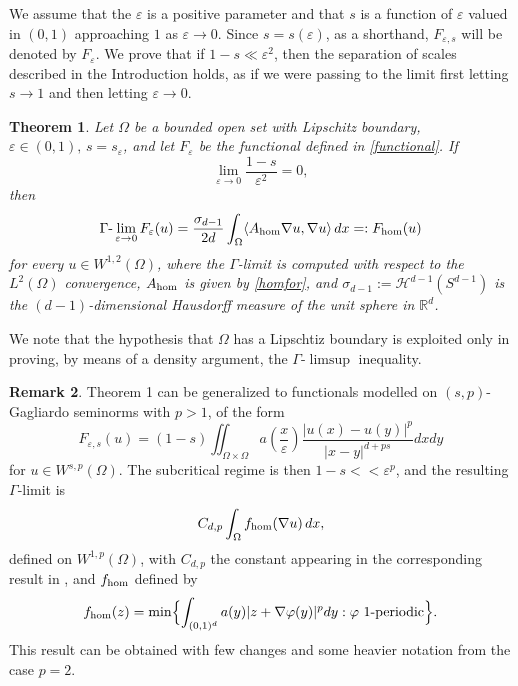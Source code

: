 \documentclass[11pt,a4paper,reqno]{amsart}
\theoremstyle{plain}
\newtheorem{theorem}{Theorem}
\theoremstyle{definition}
\newtheorem{remark}[theorem]{Remark}
\newcommand\e{\varepsilon}
\theoremstyle{remark}
\begin{document}
We assume that the $\e$ is a positive parameter and that $s$ is a function of $\e$ valued in $(0,1)$ approaching $1$ as $\e\to0$. Since $s=s(\e)$, as a shorthand, $F_{\e, s}$ will be denoted by $F_\e$.
We prove that if $1-s \ll\e^2$, then the separation of scales described in the Introduction holds, as if we were passing to the limit first letting $s\to1$ and then letting $\e\to 0$. 

\begin{theorem}
Let $\Omega$ be a bounded open set with Lipschitz boundary, $\e\in(0,1), \, s=s_\e$, and let $F_{\varepsilon}$ be the functional defined in \eqref{functional}. If \begin{equation}\label{eq:1-se}
\lim_{\varepsilon \to 0}\frac{1-s}{\varepsilon^2}=0,
\end{equation}
then  
    \begin{equation}\label{mainthm}
    \Gamma\hbox{-}\lim_{\e\to0} F_{\varepsilon}(u) = \frac{\sigma_{d-1}}{2d}\int_\Omega \langle A_{\rm hom}\nabla u,\nabla u\rangle\,dx=:F_{\rm hom}(u)
    \end{equation} 
for every $u\in W^{1,2}(\Omega)$, where the $\Gamma$-limit is computed with respect to the $L^2(\Omega)$ convergence, $A_{\rm hom}$ is given by \eqref{homfor}, and $\sigma_{d-1}:={\mathcal H}^{d-1}(S^{d-1})$ is the $(d-1)$-dimensional Hausdorff measure of the unit sphere in $\mathbb{R}^d$.
\end{theorem}



We note that the hypothesis that $\Omega$ has a Lipschtiz boundary is exploited only in proving, by means of  a density argument, the $\Gamma$-$\limsup$ inequality.

\begin{remark}\rm Theorem 1 can be generalized to functionals modelled on $(s,p)$-Gagliardo seminorms with $p>1$, of the form 
\begin{equation}\label{functional-p}
    F_{\varepsilon,s}(u)=(1-s)\iint_{\Omega\times \Omega} a\left(\frac{x}{\varepsilon}\right)\frac{\lvert u(x)-u(y)\rvert^p}{\lvert x-y\rvert^{d+ps}}dxdy
\end{equation}
 for $u\in W^{s,p}(\Omega)$. The subcritical regime is then $1-s<\!<\e^p$, and the resulting $\Gamma$-limit is 
$$C_{d,p}\int_\Omega f_{\rm hom} (\nabla u)\,dx,$$
defined on $W^{1,p}(\Omega)$, with $C_{d,p}$ the constant appearing in the corresponding result in \cite{bbm}, and $f_{\rm hom}$ defined by 
\begin{equation}\label{homfor-p}
f_{\rm hom}(z)=\min\Bigl\{\int_{(0,1)^d} a(y)|z+\nabla \varphi(y)|^pdy: \varphi\  1\hbox{-periodic}\Bigr\}.
\end{equation}
This result can be obtained with few changes and some heavier notation from the case $p=2$. 
\end{remark}
\end{document}
